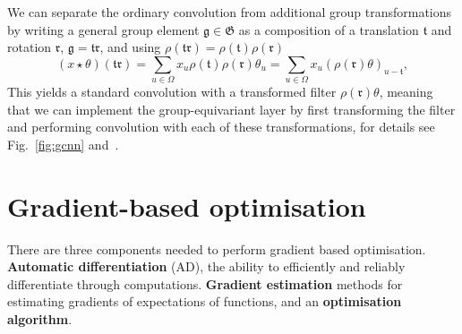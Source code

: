 We can separate the ordinary convolution from additional group transformations by writing a general group element $\mathfrak{g} \in \mathfrak{G}$ as a composition of a translation $\mathfrak{t}$ and rotation $\mathfrak{r}$, $\mathfrak g = \mathfrak{tr}$, and using  $\rho(\mathfrak{t r})=\rho(\mathfrak{t}) \rho(\mathfrak{r})$
\begin{equation}
	(x \star \theta)(\mathfrak{t r}) =\sum_{u \in \Omega} x_{u} \rho(\mathfrak{t}) \rho(\mathfrak{r}) \theta_{u} =\sum_{u \in \Omega} x_{u}(\rho(\mathfrak{r}) \theta)_{u-\mathfrak{t}},
\end{equation}
This yields a standard convolution with a transformed filter $\rho(\mathfrak{r})\theta$, meaning that we can implement the group-equivariant layer by first transforming the filter and performing convolution with each of these transformations, for details see Fig.~\ref{fig:gcnn} and~\cite{cohen2016group}.

\section{Gradient-based optimisation}
\label{sec:gbopt}
There are three components needed to perform gradient based optimisation. \textbf{Automatic differentiation} (AD), the ability to efficiently and reliably differentiate through computations. \textbf{Gradient estimation} methods for estimating gradients of expectations of functions, and an \textbf{optimisation algorithm}.

